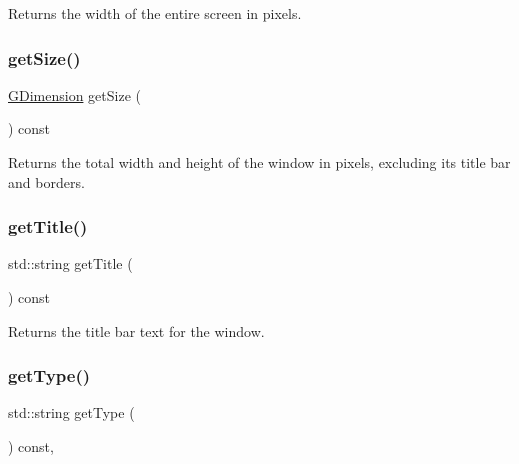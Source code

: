 Returns the width of the entire screen in pixels. 

\mbox{\label{classGWindow_a7b4eec96a2bdc6420695d5796a78eea9}} 
\subsubsection{\texorpdfstring{get\+Size()}{getSize()}}
{\footnotesize\ttfamily \mbox{\hyperlink{structGDimension}{G\+Dimension}} get\+Size (\begin{DoxyParamCaption}{ }\end{DoxyParamCaption}) const\hspace{0.3cm}{\ttfamily [virtual]}}



Returns the total width and height of the window in pixels, excluding its title bar and borders. 

\mbox{\label{classGWindow_abc7651e67987c4682fed77d92a860bba}} 
\subsubsection{\texorpdfstring{get\+Title()}{getTitle()}}
{\footnotesize\ttfamily std\+::string get\+Title (\begin{DoxyParamCaption}{ }\end{DoxyParamCaption}) const\hspace{0.3cm}{\ttfamily [virtual]}}



Returns the title bar text for the window. 

\mbox{\label{classGWindow_a9b72ede4ee8520f987a0c01e30654814}} 
\subsubsection{\texorpdfstring{get\+Type()}{getType()}}
{\footnotesize\ttfamily std\+::string get\+Type (\begin{DoxyParamCaption}{ }\end{DoxyParamCaption}) const\hspace{0.3cm}{\ttfamily [override]}, {\ttfamily [virtual]}}



